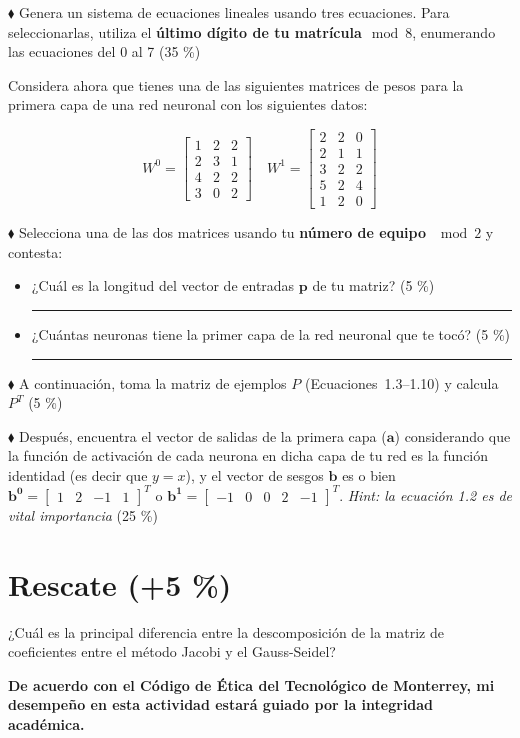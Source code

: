 \documentclass{article}
\newcommand{\responserule}{{\large\rule{14 cm}{0.3mm}}}
\begin{document}
$\blacklozenge$ Genera un sistema de ecuaciones lineales usando tres ecuaciones. Para seleccionarlas, utiliza el \textbf{último dígito de tu matrícula}$\mod 8$, enumerando las ecuaciones del 0 al 7 (35 \%)

Considera ahora que tienes una de las siguientes matrices de pesos para la primera capa de una red neuronal con los siguientes datos:

\[
    W^0 = \begin{bmatrix}
        1 & 2 & 2 \\
        2 & 3 & 1 \\
        4 & 2 & 2 \\
        3 & 0 & 2
    \end{bmatrix} \quad W^1=
    \begin{bmatrix}
        2 & 2 & 0 \\
        2 & 1 & 1 \\
        3 & 2 & 2 \\
        5 & 2 & 4 \\
        1 & 2 & 0
    \end{bmatrix}
\]

$\blacklozenge$ Selecciona una de las dos matrices usando tu \textbf{número de equipo} $\mod 2$ y contesta:

\begin{itemize}
    \itemsep2.5ex
    \item ¿Cuál es la longitud del vector de entradas $\mathbf{p}$ de tu matriz? (5 \%)\\ \responserule
    \item ¿Cuántas neuronas tiene la primer capa de la red neuronal que te tocó? (5 \%)\\ \responserule
\end{itemize}

$\blacklozenge$ A continuación, toma la matriz de ejemplos $P$ (Ecuaciones~1.3--1.10) y calcula $P^T$ (5 \%)

\vspace{2.5ex}

$\blacklozenge$ Después, encuentra el vector de salidas de la primera capa ($\mathbf{a}$) considerando que la función de activación de cada neurona en dicha capa de tu red es la función identidad (es decir que $y = x$), y el vector de sesgos $\mathbf{b}$ es o bien
$\mathbf{b^0} = \begin{bmatrix} 1 & 2 & -1 & 1 \end{bmatrix}^T$ o
$\mathbf{b^1} = \begin{bmatrix} -1 & 0  & 0  & 2 & -1 \end{bmatrix}^T$. \textit{\footnotesize Hint: la ecuación 1.2 es de vital importancia} (25 \%)


\section*{Rescate (+5 \%)}

¿Cuál es la principal diferencia entre la descomposición de la matriz de coeficientes entre el método Jacobi y el Gauss-Seidel?

\vfill

\textbf{De acuerdo con el Código de Ética del Tecnológico de Monterrey, mi desempeño en esta actividad estará guiado por la integridad académica.}
\end{document}

